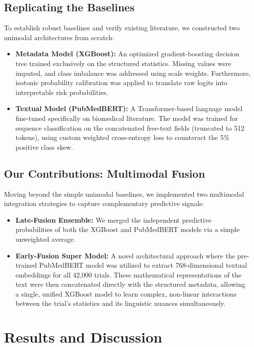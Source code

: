 \documentclass[11pt,a4paper]{article}
\begin{document}
\subsection{Replicating the Baselines}
To establish robust baselines and verify existing literature, we constructed two unimodal architectures from scratch:
\begin{itemize}
    \item \textbf{Metadata Model (XGBoost):} An optimized gradient-boosting decision tree trained exclusively on the structured statistics. Missing values were imputed, and class imbalance was addressed using scale weights. Furthermore, isotonic probability calibration was applied to translate raw logits into interpretable risk probabilities.
    \item \textbf{Textual Model (PubMedBERT):} A Transformer-based language model fine-tuned specifically on biomedical literature. The model was trained for sequence classification on the concatenated free-text fields (truncated to 512 tokens), using custom weighted cross-entropy loss to counteract the 5\% positive class skew.
\end{itemize}

\subsection{Our Contributions: Multimodal Fusion}
Moving beyond the simple unimodal baselines, we implemented two multimodal integration strategies to capture complementary predictive signals:
\begin{itemize}
    \item \textbf{Late-Fusion Ensemble:} We merged the independent predictive probabilities of both the XGBoost and PubMedBERT models via a simple unweighted average.
    \item \textbf{Early-Fusion Super Model:} A novel architectural approach where the pre-trained PubMedBERT model was utilized to extract 768-dimensional textual embeddings for all 42,000 trials. These mathematical representations of the text were then concatenated directly with the structured metadata, allowing a single, unified XGBoost model to learn complex, non-linear interactions between the trial's statistics and its linguistic nuances simultaneously.
\end{itemize}

\section{Results and Discussion}
\end{document}
